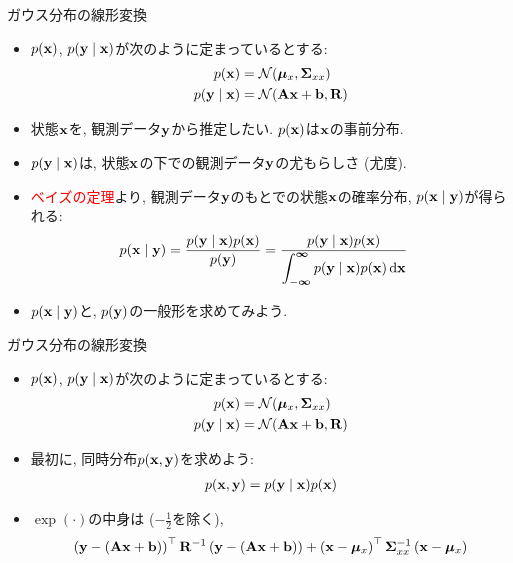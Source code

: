\documentclass[dvipdfmx,notheorems,t]{beamer}
\begin{document}
\begin{frame}{ガウス分布の線形変換}
\begin{itemize}
  \item $p(\vb{x})$, $p(\vb{y} \mid \vb{x})$が次のように定まっているとする:
  \begin{align*}
    p(\vb{x}) &= \mathcal{N}(\vb*{\mu}_x, \vb{\Sigma}_{xx}) \\
    p(\vb{y} \mid \vb{x}) &= \mathcal{N}(\vb{A} \vb{x} + \vb{b}, \vb{R})
  \end{align*}
  \item 状態$\vb{x}$を, 観測データ$\vb{y}$から推定したい. $p(\vb{x})$は$\vb{x}$の事前分布.
  \item $p(\vb{y} \mid \vb{x})$は, 状態$\vb{x}$の下での観測データ$\vb{y}$の尤もらしさ (尤度).
  \item \textcolor{red}{ベイズの定理}より, 観測データ$\vb{y}$のもとでの状態$\vb{x}$の確率分布,
  $p(\vb{x} \mid \vb{y})$が得られる:
  \begin{align*}
    p(\vb{x} \mid \vb{y}) &= \frac{p(\vb{y} \mid \vb{x}) p(\vb{x})}{p(\vb{y})}
      = \frac{p(\vb{y} \mid \vb{x}) p(\vb{x})}{
      \displaystyle \int_{-\boldsymbol{\infty}}^{\boldsymbol{\infty}}
      p(\vb{y} \mid \vb{x}) p(\vb{x}) \dd{\vb{x}}}
  \end{align*}
  \item $p(\vb{x} \mid \vb{y})$と, $p(\vb{y})$の一般形を求めてみよう.
\end{itemize}
\end{frame}

\begin{frame}{ガウス分布の線形変換}
\begin{itemize}
  \item $p(\vb{x})$, $p(\vb{y} \mid \vb{x})$が次のように定まっているとする:
  \begin{align*}
    p(\vb{x}) &= \mathcal{N}(\vb*{\mu}_x, \vb{\Sigma}_{xx}) \\
    p(\vb{y} \mid \vb{x}) &= \mathcal{N}(\vb{A} \vb{x} + \vb{b}, \vb{R})
  \end{align*}
  \item 最初に, 同時分布$p(\vb{x}, \vb{y})$を求めよう:
  \begin{align*}
    p(\vb{x}, \vb{y}) = p(\vb{y} \mid \vb{x}) p(\vb{x})
  \end{align*}
  \item $\exp(\cdot)$の中身は ($-\frac{1}{2}$を除く),
  \begin{align*}
    \left( \vb{y} - \left( \vb{A} \vb{x} + \vb{b} \right) \right)^\top \vb{R}^{-1}
      \left( \vb{y} - \left( \vb{A} \vb{x} + \vb{b} \right) \right)
      + \left( \vb{x} - \vb*{\mu}_x \right)^\top \vb{\Sigma}_{xx}^{-1}
      \left( \vb{x} - \vb*{\mu}_x \right)
  \end{align*}
\end{itemize}
\end{frame}
\end{document}
